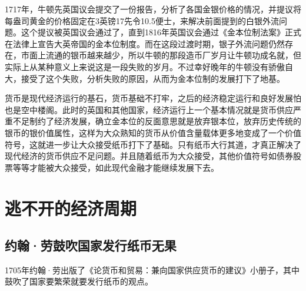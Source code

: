\documentclass[12pt,oneside]{book}
\begin{document}
1717年，牛顿先英国议会提交了一份报告，分析了各国金银价格的情况，并提议将每盎司黄金的价格固定在3英镑17先令10.5便士，来解决前面提到的白银外流问题。这个提议被英国议会通过了，直到1816年英国议会通过《金本位制法案》正式在法律上宣告大英帝国的金本位制度。而在这段过渡时期，银子外流问题仍然存在，市面上流通的银币越来越少，所以牛顿的那段造币厂岁月让牛顿功成名就，但实际上从某种意义上来说这是一段失败的岁月。不过幸好晚年的牛顿没有骄傲自大，接受了这个失败，分析失败的原因，从而为金本位制的发展打下了地基。

货币是现代经济运行的基石，货币基础不打牢，之后的经济稳定运行和良好发展怕也是空中楼阁。此时的英国和其他国家，经济运行上一个基本情况就是货币供应严重不足制约了经济发展，确立金本位的反面意思就是放弃银本位，放弃历史传统的银币的银价值属性，这样为大众熟知的货币从价值含量载体更多地变成了一个价值符号，这就进一步让大众接受纸币打下了基础。只有纸币大行其道，才真正解决了现代经济的货币供应不足问题。并且随着纸币为大众接受，其他价值符号如债券股票等等才能被大众接受，如此现代金融才能继续发展下去。



\chapter{逃不开的经济周期}
\section{约翰·劳鼓吹国家发行纸币无果}
1705年约翰·劳出版了《论货币和贸易：兼向国家供应货币的建议》小册子，其中鼓吹了国家要繁荣就要发行纸币的观点。
\end{document}

